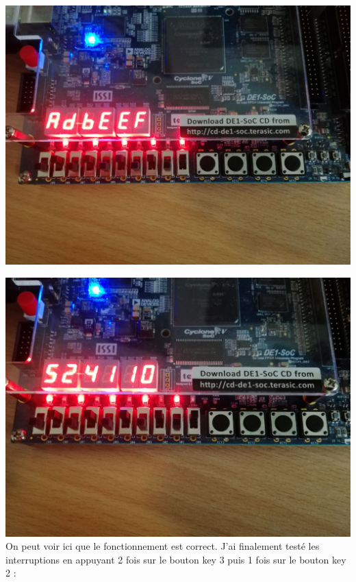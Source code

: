 \includegraphics[scale=0.3]{./images/testp3.jpeg}

\includegraphics[scale=0.3]{./images/testp4.jpeg}
On peut voir ici que le fonctionnement est correct. J'ai finalement testé les interruptions en appuyant 2 fois sur le bouton key 3 puis 1 fois sur le bouton key 2 : \\

